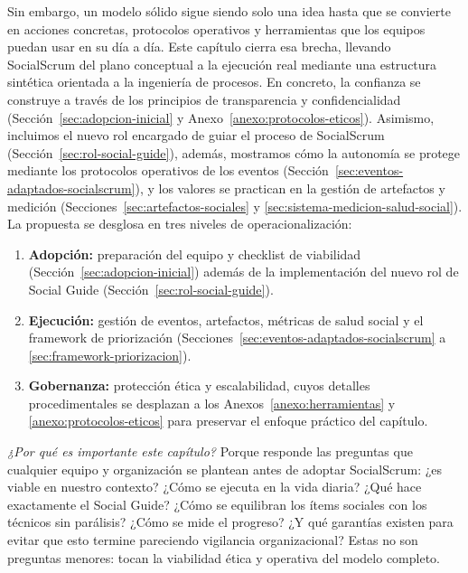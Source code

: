 Sin embargo, un modelo sólido sigue siendo solo una idea hasta que se convierte en acciones concretas, protocolos operativos y herramientas que los equipos puedan usar en su día a día. Este capítulo cierra esa brecha, llevando SocialScrum del plano conceptual a la ejecución real mediante una estructura sintética orientada a la ingeniería de procesos.
En concreto, la confianza se construye a través de los principios de transparencia y confidencialidad (Sección~\ref{sec:adopcion-inicial} y Anexo~\ref{anexo:protocolos-eticos}). Asimismo, incluimos el nuevo rol encargado de guiar el proceso de SocialScrum (Sección~\ref{sec:rol-social-guide}), además, mostramos cómo la autonomía se protege mediante los protocolos operativos de los eventos (Sección~\ref{sec:eventos-adaptados-socialscrum}), y los valores se practican en la gestión de artefactos y medición (Secciones~\ref{sec:artefactos-sociales} y \ref{sec:sistema-medicion-salud-social}). La propuesta se desglosa en tres niveles de operacionalización:
\begin{enumerate}
    \item \textbf{Adopción:} preparación del equipo y checklist de viabilidad (Sección~\ref{sec:adopcion-inicial}) además de la implementación del nuevo rol de Social Guide (Sección~\ref{sec:rol-social-guide}).
    \item \textbf{Ejecución:} gestión de eventos, artefactos, métricas de salud social y el framework de priorización (Secciones~\ref{sec:eventos-adaptados-socialscrum} a \ref{sec:framework-priorizacion}).
    \item \textbf{Gobernanza:} protección ética y escalabilidad, cuyos detalles procedimentales se desplazan a los Anexos~\ref{anexo:herramientas} y \ref{anexo:protocolos-eticos} para preservar el enfoque práctico del capítulo.
\end{enumerate}

\textit{¿Por qué es importante este capítulo?} Porque responde las preguntas que cualquier equipo y organización se plantean antes de adoptar SocialScrum: ¿es viable en nuestro contexto? ¿Cómo se ejecuta en la vida diaria? ¿Qué hace exactamente el Social Guide? ¿Cómo se equilibran los ítems sociales con los técnicos sin parálisis? ¿Cómo se mide el progreso? ¿Y qué garantías existen para evitar que esto termine pareciendo vigilancia organizacional? Estas no son preguntas menores: tocan la viabilidad ética y operativa del modelo completo.

